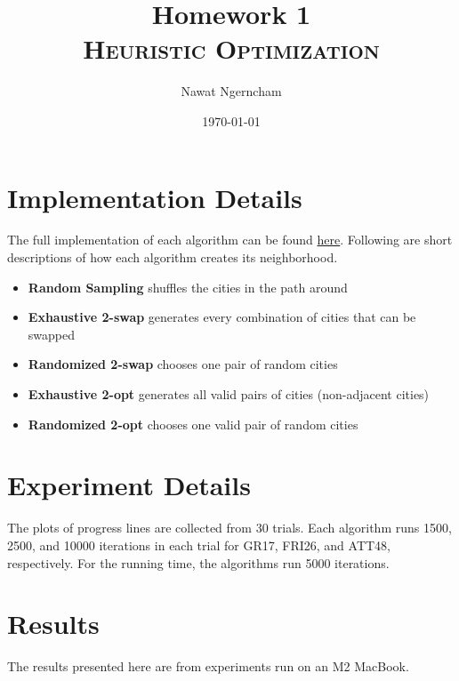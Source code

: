 \documentclass{article}
\title{\Huge{Homework 1}
	\\
	\Large\scshape{Heuristic Optimization}}
\author{Nawat Ngerncham}
\date{\today}
\begin{document}
\maketitle
	
\section{Implementation Details}

The full implementation of each algorithm can be found \href{https://github.com/nngerncham/ma395_heuristic/tree/main/homework/hw1/tsp_algorithms}{here}. Following are short descriptions of how each algorithm creates its neighborhood.

\begin{itemize}
    \item \textbf{Random Sampling} shuffles the cities in the path around
    \item \textbf{Exhaustive 2-swap} generates every combination of cities that can be swapped
    \item \textbf{Randomized 2-swap} chooses one pair of random cities
    \item \textbf{Exhaustive 2-opt} generates all valid pairs of cities (non-adjacent cities)
    \item \textbf{Randomized 2-opt} chooses one valid pair of random cities
\end{itemize}

\section{Experiment Details}

The plots of progress lines are collected from 30 trials. Each algorithm runs 1500, 2500, and 10000 iterations in each trial for GR17, FRI26, and ATT48, respectively. For the running time, the algorithms run 5000 iterations.

\section{Results}

The results presented here are from experiments run on an M2 MacBook.
\end{document}
